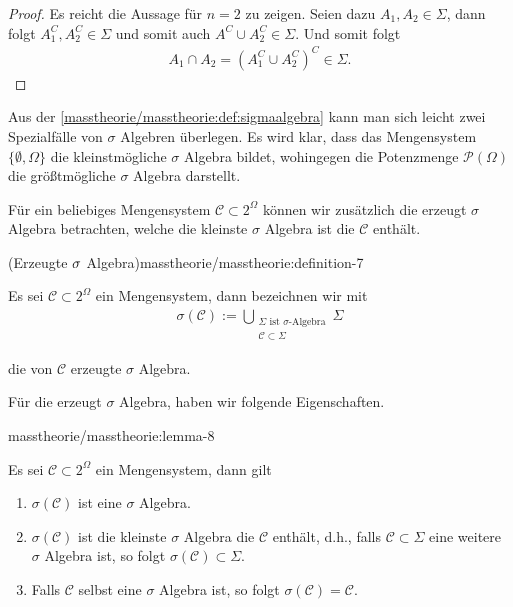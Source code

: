 \begin{proof}
 Es reicht die Aussage für \(n=2\) zu zeigen. Seien dazu \(A_1,A_2\in\Sigma\), dann folgt \(A_1^C,A_2^C\in\Sigma\) und somit auch \(A^C\cup A_2^C\in\Sigma\). Und somit folgt
\begin{align*}
A_1\cap A_2 = (A_1^C\cup A_2^C)^C \in \Sigma.
\end{align*}\end{proof}

\par
Aus der \cref{masstheorie/masstheorie:def:sigmaalgebra} kann man sich leicht zwei Spezialfälle von \(\sigma\) Algebren überlegen.
Es wird klar, dass das Mengensystem \(\{\emptyset, \Omega\}\) die kleinstmögliche \(\sigma\) Algebra bildet, wohingegen die Potenzmenge \(\mathcal{P}(\Omega)\) die größtmögliche \(\sigma\) Algebra darstellt.

\par
Für ein beliebiges Mengensystem \(\mathcal{C}\subset 2^\Omega\) können wir zusätzlich die erzeugt \(\sigma\) Algebra betrachten, welche die kleinste \(\sigma\) Algebra ist die \(\mathcal{C}\) enthält.
\begin{definition}{(Erzeugte \protect\(\sigma\protect\) Algebra)}{masstheorie/masstheorie:definition-7}



\par
Es sei \(\mathcal{C}\subset 2^\Omega\) ein Mengensystem, dann bezeichnen wir mit
\begin{align*}
\sigma(\mathcal{C}) := \bigcup_{\substack{\Sigma \text{ ist $\sigma$-Algebra}\\ \mathcal{C} \subset \Sigma}} \Sigma
\end{align*}
\par
die von \(\mathcal{C}\) erzeugte \(\sigma\) Algebra.
\end{definition}

\par
Für die erzeugt \(\sigma\) Algebra, haben wir folgende Eigenschaften.
\begin{lemma}{}{masstheorie/masstheorie:lemma-8}



\par
Es sei \(\mathcal{C}\subset 2^\Omega\) ein Mengensystem, dann gilt
\begin{enumerate}

\item {} 
\par
\(\sigma(\mathcal{C})\) ist eine \(\sigma\) Algebra.

\item {} 
\par
\(\sigma(\mathcal{C})\) ist die kleinste \(\sigma\) Algebra die \(\mathcal{C}\) enthält, d.h., falls \(\mathcal{C}\subset\Sigma\) eine weitere \(\sigma\) Algebra ist, so folgt \(\sigma(\mathcal{C})\subset\Sigma\).

\item {} 
\par
Falls \(\mathcal{C}\) selbst eine \(\sigma\) Algebra ist, so folgt \(\sigma(\mathcal{C}) = \mathcal{C}\).

\end{enumerate}
\end{lemma}

